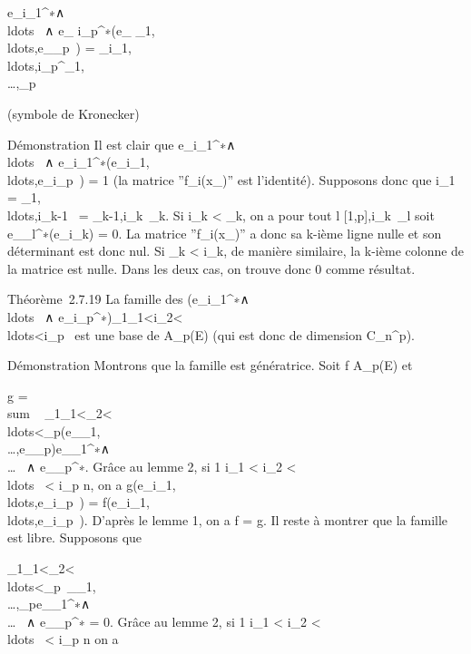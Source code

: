\documentclass[]{article}
\begin{document}
e\_i\_1^∗∧\\ldots~
∧ e\_ i\_p^∗(e\_
\jmath\_1,\\ldots,e\_\jmath\_p~)
=
\delta\_i\_1,\\ldots,i\_p^\jmath\_1,\\\ldots,\jmath\_p~


(symbole de Kronecker)

Démonstration Il est clair que
e\_i\_1^∗∧\\ldots~
∧
e\_i\_1^∗(e\_i\_1,\\ldots,e\_i\_p~)
= 1 (la matrice ''f\_i(x\_\jmath)'' est l'identité).
Supposons donc que i\_1 =
\jmath\_1,\\ldots,i\_k-1~
= \jmath\_k-1,i\_k\neq~\jmath\_k.
Si i\_k \textless{} \jmath\_k, on a pour tout l \in
{[}1,p{]},i\_k\neq~\jmath\_l soit
e\_\jmath\_l^∗(e\_i\_k) = 0. La
matrice ''f\_i(x\_\jmath)'' a donc sa k-ième ligne nulle et
son déterminant est donc nul. Si \jmath\_k \textless{} i\_k,
de manière similaire, la k-ième colonne de la matrice est nulle. Dans
les deux cas, on trouve donc 0 comme résultat.

Théorème~2.7.19 La famille des
(e\_i\_1^∗∧\\ldots~
∧
e\_i\_p^∗)\_1\leqi\_1\textless{}i\_2\textless{}\\ldots\textless{}i\_p\leqn~
est une base de A\_p(E) (qui est donc de dimension
C\_n^p).

Démonstration Montrons que la famille est génératrice. Soit f \in
A\_p(E) et

g = \\sum ~
\_1\leq\jmath\_1\textless{}\jmath\_2\textless{}\\ldots\textless{}\jmath\_p\leqnf(e\_\jmath\_1,\\\ldots,e\_\jmath\_p)e\_\jmath\_1^∗∧\\\ldots~
∧ e\_\jmath\_p^∗. Grâce au lemme 2, si 1 \leq
i\_1 \textless{} i\_2 \textless{}
\\ldots~ \textless{}
i\_p \leq n, on a
g(e\_i\_1,\\ldots,e\_i\_p~)
=
f(e\_i\_1,\\ldots,e\_i\_p~).
D'après le lemme 1, on a f = g. Il reste à montrer que la famille est
libre. Supposons que \\\sum

\_1\leq\jmath\_1\textless{}\jmath\_2\textless{}\\ldots\textless{}\jmath\_p\leqn\lambda~\_\jmath\_1,\\\ldots,\jmath\_pe\_\jmath\_1^∗∧\\\ldots~
∧ e\_\jmath\_p^∗ = 0. Grâce au lemme 2, si 1 \leq
i\_1 \textless{} i\_2 \textless{}
\\ldots~ \textless{}
i\_p \leq n on a
\end{document}
